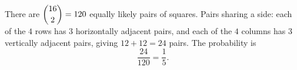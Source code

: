 There are $\dbinom{16}{2}=120$ equally likely pairs of squares. Pairs sharing a side: each of the $4$ rows has $3$ horizontally adjacent pairs, and each of the $4$ columns has $3$ vertically adjacent pairs, giving $12+12=24$ pairs. The probability is
\[\dfrac{24}{120}=\boxed{\dfrac15}.\]
